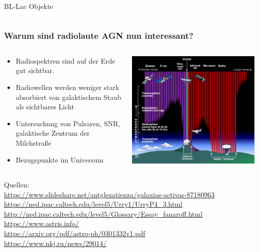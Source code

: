 \documentclass[aspectratio=1610, 9pt]{beamer}
\begin{document}
\begin{frame}
\begin{block}{BL-Lac Objekte}
\begin{columns}
\begin{column}[c]{0.45\linewidth}
    \end{column}
    \end{columns}
  \end{block}
\end{frame}

\begin{frame}\frametitle{Warum sind radiolaute AGN nun interessant?}
  \begin{columns}
  \begin{column}[c]{0.45\textwidth}
  \begin{itemize}
    \item Radiospektren sind auf der Erde gut sichtbar.
    \item Radiowellen werden weniger stark absorbiert von galaktischem Staub als sichtbares Licht
    \item Untersuchung von Pulsaren, SNR, galaktische Zentrum der Milchstra\ss e
    \item Bezugspunkte im Universum
  \end{itemize}
  \end{column}
  \begin{column}[c]{0.45\textwidth}
    \includegraphics{images/durchlaessigkeit.png}
  \end{column}
  \end{columns}
\end{frame}

\begin{frame}
Quellen: \\
\url{https://www.slideshare.net/antglezatienza/galaxias-activas-87180963} \\
\url{https://ned.ipac.caltech.edu/level5/Urry1/UrryP4_3.html} \\
\url{http://ned.ipac.caltech.edu/level5/Glossary/Essay_fanaroff.html} \\
\url{https://www.astris.info/} \\
\url{https://arxiv.org/pdf/astro-ph/0301332v1.pdf} \\
\url{https://www.nkj.ru/news/29014/}
\end{frame}
\end{document}
